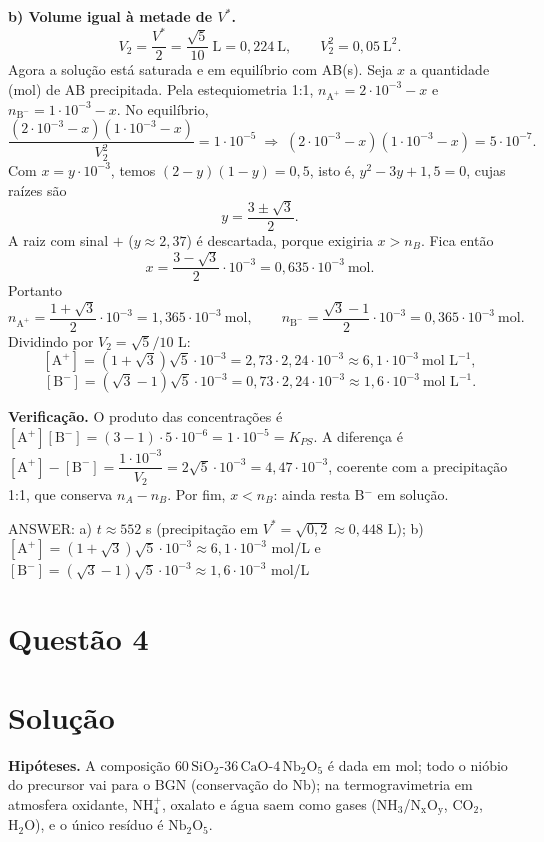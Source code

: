 \documentclass{article}%
\begin{document}
\textbf{b) Volume igual à metade de $V^*$.}
\[
V_2=\frac{V^*}{2}=\frac{\sqrt5}{10}\ \text{L}=0{,}224\ \text{L},\qquad V_2^2=0{,}05\ \text{L}^2 .
\]
Agora a solução está saturada e em equilíbrio com AB(s). Seja $x$ a quantidade (mol) de AB precipitada. Pela estequiometria 1:1, $n_{\text{A}^+}=2\cdot10^{-3}-x$ e $n_{\text{B}^-}=1\cdot10^{-3}-x$. No equilíbrio,
\[
\frac{(2\cdot10^{-3}-x)(1\cdot10^{-3}-x)}{V_2^2}=1\cdot10^{-5}
\;\Rightarrow\;(2\cdot10^{-3}-x)(1\cdot10^{-3}-x)=5\cdot10^{-7}.
\]
Com $x=y\cdot10^{-3}$, temos $(2-y)(1-y)=0{,}5$, isto é, $y^2-3y+1{,}5=0$, cujas raízes são
\[
y=\frac{3\pm\sqrt3}{2}.
\]
A raiz com sinal $+$ ($y\approx2{,}37$) é descartada, porque exigiria $x>n_B$. Fica então
\[
x=\frac{3-\sqrt3}{2}\cdot10^{-3}=0{,}635\cdot10^{-3}\ \text{mol}.
\]
Portanto
\[
n_{\text{A}^+}=\frac{1+\sqrt3}{2}\cdot10^{-3}=1{,}365\cdot10^{-3}\ \text{mol},\qquad
n_{\text{B}^-}=\frac{\sqrt3-1}{2}\cdot10^{-3}=0{,}365\cdot10^{-3}\ \text{mol}.
\]
Dividindo por $V_2=\sqrt5/10$ L:
\[
[\text{A}^+]=(1+\sqrt3)\sqrt5\cdot10^{-3}=2{,}73\cdot2{,}24\cdot10^{-3}\approx6{,}1\cdot10^{-3}\ \text{mol L}^{-1},
\]
\[
[\text{B}^-]=(\sqrt3-1)\sqrt5\cdot10^{-3}=0{,}73\cdot2{,}24\cdot10^{-3}\approx1{,}6\cdot10^{-3}\ \text{mol L}^{-1}.
\]

\textbf{Verificação.} O produto das concentrações é $[\text{A}^+][\text{B}^-]=(3-1)\cdot5\cdot10^{-6}=1\cdot10^{-5}=K_{PS}$. A diferença é $[\text{A}^+]-[\text{B}^-]=\dfrac{1\cdot10^{-3}}{V_2}=2\sqrt5\cdot10^{-3}=4{,}47\cdot10^{-3}$, coerente com a precipitação 1:1, que conserva $n_A-n_B$. Por fim, $x<n_B$: ainda resta B$^-$ em solução.

ANSWER: a) $t\approx552$ s (precipitação em $V^*=\sqrt{0{,}2}\approx0{,}448$ L); b) $[\text{A}^+]=(1+\sqrt3)\sqrt5\cdot10^{-3}\approx6{,}1\cdot10^{-3}$ mol/L e $[\text{B}^-]=(\sqrt3-1)\sqrt5\cdot10^{-3}\approx1{,}6\cdot10^{-3}$ mol/L%
\newpage%
\section*{Questão 4}

\section*{Solução}

\textbf{Hipóteses.} A composição $60\,\mathrm{SiO_2}$-$36\,\mathrm{CaO}$-$4\,\mathrm{Nb_2O_5}$ é dada em mol; todo o nióbio do precursor vai para o BGN (conservação do Nb); na termogravimetria em atmosfera oxidante, $\mathrm{NH_4^+}$, oxalato e água saem como gases ($\mathrm{NH_3}$/$\mathrm{N_xO_y}$, $\mathrm{CO_2}$, $\mathrm{H_2O}$), e o único resíduo é $\mathrm{Nb_2O_5}$.
\end{document}
